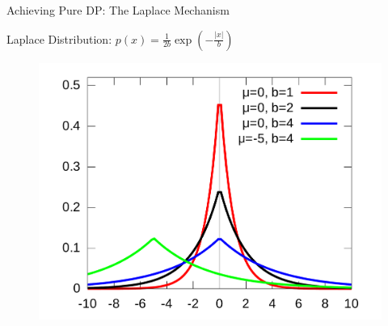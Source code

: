 \documentclass[12pt,aspectratio=169]{beamer}
\begin{document}
\begin{frame}{Achieving Pure DP: The Laplace Mechanism}

Laplace Distribution: $p(x) = \frac{1}{2b}\exp (-\frac{|x|}{b})$

\begin{figure}
    \centering
    \includegraphics[width=0.6\linewidth]{figures/Laplace_pdf.pdf}
\end{figure}

\end{frame}
\end{document}
